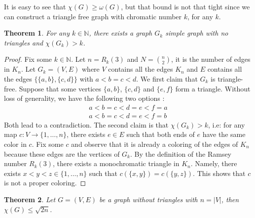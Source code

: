 \documentclass{tufte-handout}
\newtheorem{thm}{Theorem}
\theoremstyle{definition}
\theoremstyle{remark}
\newcommand{\N}{\mathbb{N}}
\begin{document}
It is easy to see that $\chi(G) \geq \omega(G)$, but that bound is not that tight since we can construct a triangle free graph with chromatic number $k$, for any $k$.
\begin{thm}
	For any $k \in \N$, there exists a graph $G_k$ simple graph with no triangles and $\chi(G_k) > k$.
\end{thm}
\begin{proof}
	Fix some $k \in \N$. Let $n = R_k(3)$ and $N = \binom{n}{2}$, it is the number of edges in $K_n$. Let $G_k = (V,E)$ where $V$ contains all the edges $K_n$ and $E$ contains all the edges $\{\{a,b\}, \{c,d\}\}$ with $a<b = c<d$. We first claim that $G_k$ is triangle-free. Suppose that some vertices $\{a,b\}$, $\{c,d\}$ and $\{e,f\}$ form a triangle. Without loss of generality, we have the following two options :
	\begin{align*}
	a < b = c < d = e < f = a\\
	a < b = c < d = e < f = b
	\end{align*}
	Both lead to a contradiction. The second claim is that $\chi(G_k) > k$, i.e: for any map $c : V \rightarrow \{1,\dots, n\}$, there exists $e \in E$ such that both ends of $e$ have the same color in $c$. Fix some $c$ and observe that it is already a coloring of the edges of $K_n$ because these edges are the vertices of $G_k$. By the definition of the Ramsey number $R_k(3)$, there exists a monochromatic triangle in $K_n$. Namely, there exists $x < y< z \in \{1,\dots, n\}$ such that $c(\{x,y\}) = c(\{y,z\})$. This shows that $c$ is not a proper coloring.
\end{proof}
\begin{thm}
	Let $G = (V,E)$ be a graph without triangles with $n = |V|$, then $\chi(G) \leq \sqrt{2n}$.
\end{thm}
\end{document}
